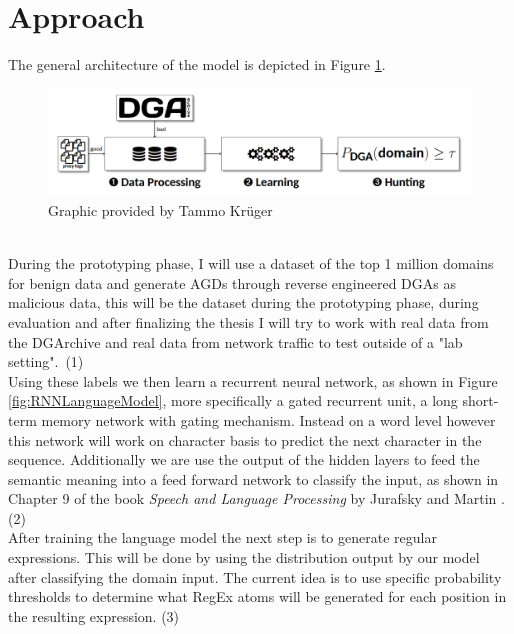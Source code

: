 \documentclass[a4paper, 12pt]{article}
\begin{document}
\section{Approach}
The general architecture of the model is depicted in Figure \ref{fig:architecture}. 
\begin{figure}[h]
    \includegraphics[width=\textwidth]{images/DGA_Detect_Architecture.png}
    \caption{Graphic provided by Tammo Kr\"uger}
    \label{fig:architecture}
\end{figure}\\
During the prototyping phase, I will use a dataset of the top 1 million domains
\cite{noauthor_cisco_nodate} for benign data and
generate AGDs through reverse engineered DGAs \cite{bader_baderjdomain_generation_algorithms_2024}
as malicious data, this will be the dataset during the prototyping phase, during evaluation and
after finalizing the thesis I will try to work with real data from the
DGArchive\cite{dgarchive_2024} and real data from
network traffic to test outside of a "lab setting".~(1)\\
Using these labels we then learn a recurrent neural network, as shown in Figure \ref{fig:RNNLanguageModel},
more specifically a gated recurrent unit, a long short-term memory network with gating mechanism.
Instead on a word level however this network will work on character basis to predict the next
character in the sequence.
Additionally we are use the output of the hidden layers to feed the semantic meaning into a feed
forward network to classify the input, as shown in Chapter 9 of the book \textit{Speech and Language
Processing} by Jurafsky and Martin \cite{jurafsky_speech_nodate}. (2)\\ 
After training the language model the next step is to generate regular expressions. This will be
done by using the distribution output by our model after classifying the domain input. The current
idea is to use specific probability thresholds to determine what RegEx atoms will be generated for
each position in the resulting expression. (3)
\end{document}
